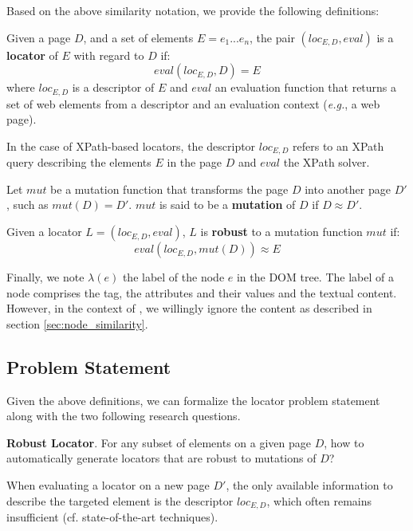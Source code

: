 \documentclass[preprint, 12pt]{elsarticle}
\begin{document}

Based on the above similarity notation, we provide the following definitions:
\begin{defn}\label{loc_def}
    Given a page $D$, and a set of elements $E = {e_1...e_n}$, the pair $(loc_{E,D}, eval)$ is a \textbf{locator} of $E$ with regard to $D$ if:
    \begin{equation}
       eval(loc_{E,D}, D) = E
    \end{equation}
    where $loc_{E,D}$ is a descriptor of $E$ and $eval$ an evaluation function that returns a set of web elements from a descriptor and an evaluation context (\emph{e.g.}, a web page).
\end{defn}
In the case of XPath-based locators, the descriptor $loc_{E,D}$ refers to an XPath query describing the elements $E$ in the page $D$ and $eval$ the XPath solver.

\begin{defn}
    Let $mut$ be a mutation function that transforms the page $D$ into another page $D'$, such as $mut(D) = D'$.
    $mut$ is said to be a \textbf{mutation} of $D$ if $D \approx D'$.
\end{defn}

\begin{defn}
    Given a locator $L = (loc_{E,D}, eval)$, $L$ is \textbf{robust} to a mutation function $mut$ if:
    \begin{equation}
       eval(loc_{E, D}, mut(D)) \approx E
    \end{equation}
\end{defn}

Finally, we note $\lambda(e)$ the label of the node $e$ in the DOM tree. The label of a node comprises the tag, the attributes and their values and the textual content. However, in the context of \erratum, we willingly ignore the content as described in section \ref{sec:node_similarity}.

\subsection{Problem Statement}
Given the above definitions, we can formalize the locator problem statement along with the two following research questions.
\begin{rqn}\label{robust_locator_problem} %
    \textbf{Robust Locator}. 
    For any subset of elements on a given page $D$, how to automatically generate locators that are robust to mutations of $D$?
\end{rqn}
When evaluating a locator on a new page $D'$, the only available information to describe the targeted element is the descriptor $loc_{E,D}$, which often remains insufficient (cf. state-of-the-art techniques).
\end{document}
